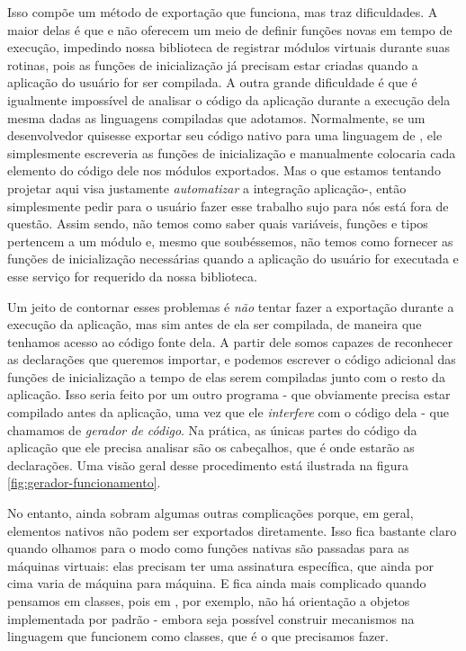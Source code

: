     Isso compõe um método de exportação que funciona, mas traz dificuldades. A
    maior delas é que \C{} e \CXX{} não oferecem um meio de definir funções
    novas em tempo de execução, impedindo nossa biblioteca de registrar módulos
    virtuais durante suas rotinas, pois as funções de inicialização já precisam
    estar criadas quando a aplicação do usuário for ser compilada. A outra
    grande dificuldade é que é igualmente impossível de analisar o código da
    aplicação durante a execução dela mesma dadas as linguagens compiladas que
    adotamos. Normalmente, se um desenvolvedor quisesse exportar seu código
    nativo para uma linguagem de \script{}, ele simplesmente escreveria as
    funções de inicialização e manualmente colocaria cada elemento do código
    dele nos módulos exportados. Mas o que estamos tentando projetar aqui visa
    justamente \emph{automatizar} a integração aplicação-, então
    simplesmente pedir para o usuário fazer esse trabalho sujo para nós está
    fora de questão. Assim sendo, não temos como saber quais variáveis, funções
    e tipos pertencem a um módulo e, mesmo que soubéssemos, não temos como
    fornecer as funções de inicialização necessárias quando a aplicação do
    usuário for executada e esse serviço for requerido da nossa biblioteca.
    
    Um jeito de contornar esses problemas é \emph{não} tentar fazer a exportação
    durante a execução da aplicação, mas sim antes de ela ser compilada, de
    maneira que tenhamos acesso ao código fonte dela. A partir dele somos
    capazes de reconhecer as declarações que queremos importar, e podemos
    escrever o código adicional das funções de inicialização a tempo
    de elas serem compiladas junto com o resto da aplicação. Isso seria feito
    por um outro programa - que obviamente precisa estar compilado antes da
    aplicação, uma vez que ele \emph{interfere} com o código dela - que chamamos
    de \emph{gerador de código}. Na prática, as únicas partes do código da
    aplicação que ele precisa analisar são os cabeçalhos, que é onde estarão as
    declarações. Uma visão geral desse procedimento está ilustrada na figura
    \ref{fig:gerador-funcionamento}.

    No entanto, ainda sobram algumas outras complicações porque, em geral,
    elementos nativos não podem ser exportados diretamente. Isso fica bastante
    claro quando olhamos para o modo como funções nativas são passadas para as
    máquinas virtuais: elas precisam ter uma assinatura específica, que ainda
    por cima varia de máquina para máquina. E fica ainda mais complicado quando
    pensamos em classes, pois em , por exemplo, não há orientação a
    objetos implementada por padrão - embora seja possível construir mecanismos
    na linguagem que funcionem como classes, que é o que precisamos fazer.

